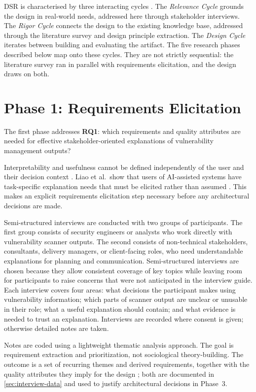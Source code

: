DSR is characterised by three interacting cycles \cite{hevner2004dsr}. The \textit{Relevance Cycle} grounds the design in real-world needs, addressed here through stakeholder interviews. The \textit{Rigor Cycle} connects the design to the existing knowledge base, addressed through the literature survey and design principle extraction. The \textit{Design Cycle} iterates between building and evaluating the artifact. The five research phases described below map onto these cycles. They are not strictly sequential: the literature survey ran in parallel with requirements elicitation, and the design draws on both.

\section{Phase 1: Requirements Elicitation}
\label{sec:methods-phase1}

The first phase addresses \textbf{RQ1}: which requirements and quality attributes are needed for effective stakeholder-oriented explanations of vulnerability management outputs?

Interpretability and usefulness cannot be defined independently of the user and their decision context \cite{doshivelez2017rigorous}. Liao et al.\ show that users of AI-assisted systems have task-specific explanation needs that must be elicited rather than assumed \cite{liao2020questioning}. This makes an explicit requirements elicitation step necessary before any architectural decisions are made.

Semi-structured interviews are conducted with two groups of participants. The first group consists of security engineers or analysts who work directly with vulnerability scanner outputs. The second consists of non-technical stakeholders, consultants, delivery managers, or client-facing roles, who need understandable explanations for planning and communication. Semi-structured interviews are chosen because they allow consistent coverage of key topics while leaving room for participants to raise concerns that were not anticipated in the interview guide. Each interview covers four areas: what decisions the participant makes using vulnerability information; which parts of scanner output are unclear or unusable in their role; what a useful explanation should contain; and what evidence is needed to trust an explanation. Interviews are recorded where consent is given; otherwise detailed notes are taken.

Notes are coded using a lightweight thematic analysis approach. The goal is requirement extraction and prioritization, not sociological theory-building. The outcome is a set of recurring themes and derived requirements, together with the quality attributes they imply for the design \cite{bass2012software}; both are documented in \cref{sec:interview-data} and used to justify architectural decisions in Phase~3.

